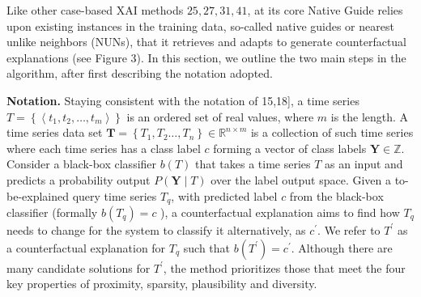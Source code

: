 
\let\svthefootnote\thefootnote
\newcommand\blfootnotetext[1]{%
  \let\thefootnote\relax\footnote{#1}%
  \addtocounter{footnote}{-1}%
  \let\thefootnote\svthefootnote%
}

\let\svfootnotetext\footnotetext
\renewcommand\footnotetext[2][?]{%
  \if\relax#1\relax%
    \ifnum\value{footnote}=0\blfootnotetext{#2}\else\svfootnotetext{#2}\fi%
  \else%
    \if?#1\ifnum\value{footnote}=0\blfootnotetext{#2}\else\svfootnotetext{#2}\fi%
    \else\svfootnotetext[#1]{#2}\fi%
  \fi
}

Like other case-based XAI methods $25,27,31,41$, at its core Native Guide relies upon existing instances in the training data, so-called native guides or nearest unlike neighbors (NUNs), that it retrieves and adapts to generate counterfactual explanations (see Figure 3). In this section, we outline the two main steps in the algorithm, after first describing the notation adopted.

\textbf{Notation.} Staying consistent with the notation of 15,18], a time series $T=\left\{\left\langle t_{1}, t_{2}, \ldots, t_{m}\right\rangle\right\}$ is an ordered set of real values, where $m$ is the length. A time series data set $\mathbf{T}=\left\{T_{1}, T_{2} \ldots, T_{n}\right\} \in \mathbb{R}^{n \times m}$ is a collection of such time series where each time series has a class label $c$ forming a vector of class labels $\mathbf{Y} \in \mathbb{Z}$. Consider a black-box classifier $b(T)$ that takes a time series $T$ as an input and predicts a probability output $P(\mathbf{Y} \mid T)$ over the label output space. Given a to-be-explained query time series $T_{q}$, with predicted label $c$ from the black-box classifier (formally $b\left(T_{q}\right)=c$ ), a counterfactual explanation aims to find how $T_{q}$ needs to change for the system to classify it alternatively, as $c^{\prime}$. We refer to $T^{\prime}$ as a counterfactual explanation for $T_{q}$ such that $b\left(T^{\prime}\right)=c^{\prime}$. Although there are many candidate solutions for $T^{\prime}$, the method prioritizes those that meet the four key properties of proximity, sparsity, plausibility and diversity.

